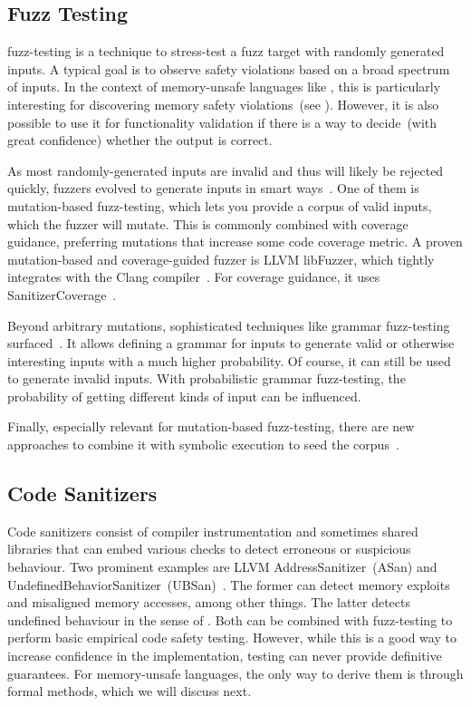 \subsection{Fuzz Testing}

\Gls{fuzz-testing} is a technique to stress-test a fuzz target with randomly generated inputs. A typical goal is to observe safety violations based on a broad spectrum of inputs. In the context of memory-unsafe languages like , this is particularly interesting for discovering memory safety violations~(see ). However, it is also possible to use it for functionality validation if there is a way to decide~(with great confidence) whether the output is correct.

As most randomly-generated inputs are invalid and thus will likely be rejected quickly, fuzzers evolved to generate inputs in smart ways~\cite{fuzzingbook2023}. One of them is mutation-based \gls{fuzz-testing}, which lets you provide a corpus of valid inputs, which the fuzzer will mutate. This is commonly combined with coverage guidance, preferring mutations that increase some code coverage metric. A proven mutation-based and coverage-guided fuzzer is LLVM libFuzzer, which tightly integrates with the Clang compiler~\cite{libfuzzer}. For coverage guidance, it uses SanitizerCoverage~\cite{sanitizer-cov}.

Beyond arbitrary mutations, sophisticated techniques like grammar \gls{fuzz-testing} surfaced~\cite{fuzzingbook2023}. It allows defining a grammar for inputs to generate valid or otherwise interesting inputs with a much higher probability. Of course, it can still be used to generate invalid inputs. With probabilistic grammar \gls{fuzz-testing}, the probability of getting different kinds of input can be influenced.

Finally, especially relevant for mutation-based \gls{fuzz-testing}, there are new approaches to combine it with symbolic execution to seed the corpus~\cite{10.1145/3183440.3183494,9394032}.

\subsection{Code Sanitizers}

Code sanitizers consist of compiler instrumentation and sometimes shared libraries that can embed various checks to detect erroneous or suspicious behaviour. Two prominent examples are LLVM AddressSanitizer~(ASan) and UndefinedBehaviorSanitizer~(UBSan)~\cite{asan,asan-paper,ubsan}. The former can detect memory exploits and misaligned memory accesses, among other things. The latter detects undefined behaviour in the sense of . Both can be combined with \gls{fuzz-testing} to perform basic empirical code safety testing. However, while this is a good way to increase confidence in the implementation, testing can never provide definitive guarantees. For memory-unsafe languages, the only way to derive them is through formal methods, which we will discuss next.

